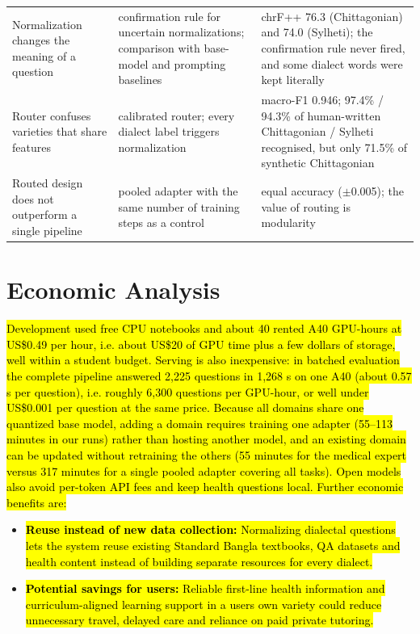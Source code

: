 \begin{longtable}{@{}L{0.200\textwidth}L{0.360\textwidth}L{0.340\textwidth}@{}}
Normalization changes the meaning of a question & confirmation rule for uncertain normalizations; comparison with base-model and prompting baselines & chrF++ 76.3 (Chittagonian) and 74.0 (Sylheti); the confirmation rule never fired, and some dialect words were kept literally \\
Router confuses varieties that share features & calibrated router; every dialect label triggers normalization & macro-F1 0.946; 97.4\% / 94.3\% of human-written Chittagonian / Sylheti recognised, but only 71.5\% of synthetic Chittagonian \\
Routed design does not outperform a single pipeline & pooled adapter with the same number of training steps as a control & equal accuracy (\ensuremath{\pm}0.005); the value of routing is modularity \\
\bottomrule
\end{longtable}

\section{Economic Analysis}\label{economic-analysis}

\hl{Development used free CPU notebooks and about 40 rented A40
GPU-hours at US\$0.49 per hour, i.e. about US\$20 of GPU time plus a few
dollars of storage, well within a student budget. Serving is also
inexpensive: in batched evaluation the complete pipeline answered 2,225
questions in 1,268 s on one A40 (about 0.57 s per question), i.e.
roughly 6,300 questions per GPU-hour, or well under US\$0.001 per
question at the same price. Because all domains share one quantized base
model, adding a domain requires training one adapter (55--113 minutes in
our runs) rather than hosting another model, and an existing domain can
be updated without retraining the others (55 minutes for the medical
expert versus 317 minutes for a single pooled adapter covering all
tasks). Open models also avoid per-token API fees and keep health
questions local. Further economic benefits are:}

\begin{itemize}
\item \hl{\textbf{Reuse instead of new data collection:} Normalizing
dialectal questions lets the system reuse existing Standard Bangla
textbooks, QA datasets and health content instead of building separate
resources for every dialect.}

\item \hl{\textbf{Potential savings for users:} Reliable first-line health
information and curriculum-aligned learning support in a
user\textquotesingle s own variety could reduce unnecessary travel,
delayed care and reliance on paid private tutoring.}
\end{itemize}
